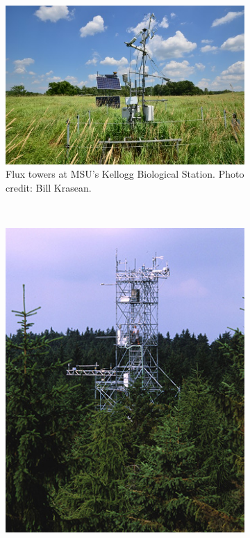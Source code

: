 \documentclass{article}\usepackage[]{graphicx}\usepackage[]{color}
\begin{document}
\begin{figure}[!ht]
    \centering
    \begin{subfigure}[ht]{0.43\textwidth}
        \includegraphics[width=\textwidth]{FluxTowerPic.jpg}
        \caption{Flux towers at MSU's Kellogg Biological Station. Photo credit: Bill Krasean.}
    \end{subfigure}
    ~ %
    \begin{subfigure}[ht]{0.3\textwidth}
        \includegraphics[width=\textwidth]{FluxTowerPic2.jpg}

\end{subfigure}
\end{figure}
\end{document}
